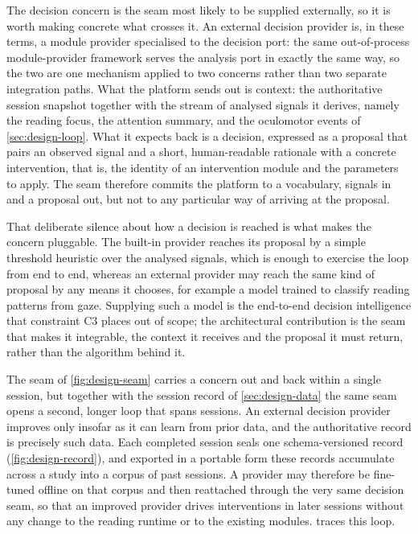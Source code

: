 The decision concern is the seam most likely to be supplied externally, so it is worth making concrete what crosses it.
An external decision provider is, in these terms, a module provider specialised to the decision port: the same out-of-process module-provider framework serves the analysis port in exactly the same way, so the two are one mechanism applied to two concerns rather than two separate integration paths.
What the platform sends out is context: the authoritative session snapshot together with the stream of analysed signals it derives, namely the reading focus, the attention summary, and the oculomotor events of \cref{sec:design-loop}.
What it expects back is a decision, expressed as a proposal that pairs an observed signal and a short, human-readable rationale with a concrete intervention, that is, the identity of an intervention module and the parameters to apply.
The seam therefore commits the platform to a vocabulary, signals in and a proposal out, but not to any particular way of arriving at the proposal.

That deliberate silence about how a decision is reached is what makes the concern pluggable.
The built-in provider reaches its proposal by a simple threshold heuristic over the analysed signals, which is enough to exercise the loop from end to end, whereas an external provider may reach the same kind of proposal by any means it chooses, for example a model trained to classify reading patterns from gaze.
Supplying such a model is the end-to-end decision intelligence that constraint C3 places out of scope; the architectural contribution is the seam that makes it integrable, the context it receives and the proposal it must return, rather than the algorithm behind it.

The seam of \cref{fig:design-seam} carries a concern out and back within a single session, but together with the session record of \cref{sec:design-data} the same seam opens a second, longer loop that spans sessions.
An external decision provider improves only insofar as it can learn from prior data, and the authoritative record is precisely such data.
Each completed session seals one schema-versioned record (\cref{fig:design-record}), and exported in a portable form these records accumulate across a study into a corpus of past sessions.
A provider may therefore be fine-tuned offline on that corpus and then reattached through the very same decision seam, so that an improved provider drives interventions in later sessions without any change to the reading runtime or to the existing modules.
 traces this loop.

